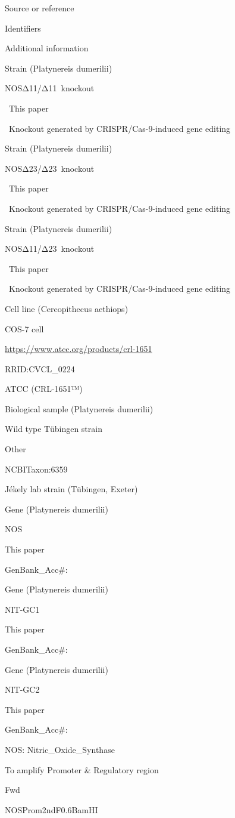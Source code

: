 \documentclass[
  10pt,
  onecolumn]{article}
\begin{document}
Source or reference

Identifiers

Additional information

Strain (Platynereis dumerilii)

NOSΔ11/Δ11~knockout

~This paper

~Knockout generated by CRISPR/Cas-9-induced gene editing

Strain (Platynereis dumerilii)

NOSΔ23/Δ23~knockout

~This paper

~Knockout generated by CRISPR/Cas-9-induced gene editing

Strain (Platynereis dumerilii)

NOSΔ11/Δ23~knockout

~This paper

~Knockout generated by CRISPR/Cas-9-induced gene editing

Cell line (Cercopithecus aethiops)

COS-7 cell

\url{https://www.atcc.org/products/crl-1651}

RRID:CVCL\_0224

ATCC (CRL-1651™)

Biological sample (Platynereis dumerilii)

Wild type Tübingen strain

Other

NCBITaxon:6359

Jékely lab strain (Tübingen, Exeter)

Gene (Platynereis dumerilii)

NOS

This paper

GenBank\_Acc\#:

Gene (Platynereis dumerilii)

NIT-GC1

This paper

GenBank\_Acc\#:

Gene (Platynereis dumerilii)

NIT-GC2

This paper

GenBank\_Acc\#:

NOS: Nitric\_Oxide\_Synthase

To amplify Promoter \& Regulatory region

Fwd

NOSProm2ndF0.6BamHI
\end{document}
